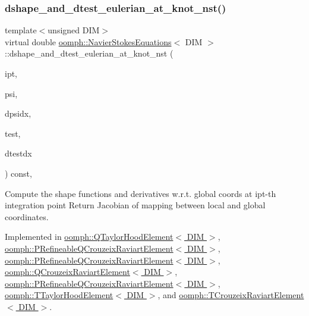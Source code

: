 \subsubsection{\texorpdfstring{dshape\+\_\+and\+\_\+dtest\+\_\+eulerian\+\_\+at\+\_\+knot\+\_\+nst()}{dshape\_and\_dtest\_eulerian\_at\_knot\_nst()}\hspace{0.1cm}{\footnotesize\ttfamily [1/2]}}
{\footnotesize\ttfamily template$<$unsigned D\+IM$>$ \\
virtual double \hyperlink{classoomph_1_1NavierStokesEquations}{oomph\+::\+Navier\+Stokes\+Equations}$<$ D\+IM $>$\+::dshape\+\_\+and\+\_\+dtest\+\_\+eulerian\+\_\+at\+\_\+knot\+\_\+nst (\begin{DoxyParamCaption}\item[{const unsigned \&}]{ipt,  }\item[{\hyperlink{classoomph_1_1Shape}{Shape} \&}]{psi,  }\item[{\hyperlink{classoomph_1_1DShape}{D\+Shape} \&}]{dpsidx,  }\item[{\hyperlink{classoomph_1_1Shape}{Shape} \&}]{test,  }\item[{\hyperlink{classoomph_1_1DShape}{D\+Shape} \&}]{dtestdx }\end{DoxyParamCaption}) const\hspace{0.3cm}{\ttfamily [protected]}, {}}



Compute the shape functions and derivatives w.\+r.\+t. global coords at ipt-\/th integration point Return Jacobian of mapping between local and global coordinates. 



Implemented in \hyperlink{classoomph_1_1QTaylorHoodElement_a25f796f83e490de92186d63ee015d708}{oomph\+::\+Q\+Taylor\+Hood\+Element$<$ D\+I\+M $>$}, \hyperlink{classoomph_1_1PRefineableQCrouzeixRaviartElement_a1694309d7e0bc7ddd2691784c37cc2f0}{oomph\+::\+P\+Refineable\+Q\+Crouzeix\+Raviart\+Element$<$ D\+I\+M $>$}, \hyperlink{classoomph_1_1PRefineableQCrouzeixRaviartElement_a1537fd64ea853532de2f09b48b0d1db8}{oomph\+::\+P\+Refineable\+Q\+Crouzeix\+Raviart\+Element$<$ D\+I\+M $>$}, \hyperlink{classoomph_1_1QCrouzeixRaviartElement_a3c4261300b81aae3ac358198b3e11906}{oomph\+::\+Q\+Crouzeix\+Raviart\+Element$<$ D\+I\+M $>$}, \hyperlink{classoomph_1_1PRefineableQCrouzeixRaviartElement_ab11329961821573134dcc4d97b0b61f0}{oomph\+::\+P\+Refineable\+Q\+Crouzeix\+Raviart\+Element$<$ D\+I\+M $>$}, \hyperlink{classoomph_1_1TTaylorHoodElement_a2e400e85a0fa2da44846f2a9d46c7066}{oomph\+::\+T\+Taylor\+Hood\+Element$<$ D\+I\+M $>$}, and \hyperlink{classoomph_1_1TCrouzeixRaviartElement_a9bedb2d2acd571834e7023831981e576}{oomph\+::\+T\+Crouzeix\+Raviart\+Element$<$ D\+I\+M $>$}.

